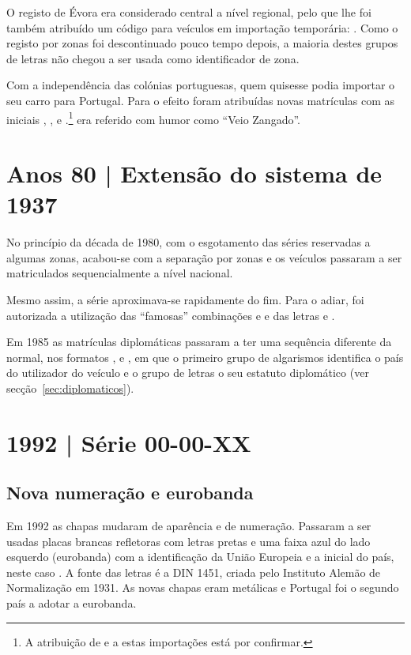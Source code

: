 O registo de Évora era considerado central a nível regional, pelo que lhe foi
também atribuído um código para veículos em importação temporária: .
Como o registo por zonas foi descontinuado pouco tempo depois, a maioria destes
grupos de letras não chegou a ser usada como identificador de zona.

Com a independência das colónias portuguesas, quem quisesse podia importar o seu
carro para Portugal. Para o efeito foram atribuídas novas matrículas com as
iniciais , ,  e .\footnote{A atribuição de  e  a estas importações está por confirmar.}
 era referido com humor como “Veio Zangado”.

\section{Anos 80 | Extensão do sistema de 1937}

No princípio da década de 1980, com o esgotamento das séries reservadas a algumas
zonas, acabou-se com a separação por zonas e os veículos passaram a ser
matriculados sequencialmente a nível nacional.

Mesmo assim, a série  aproximava-se rapidamente do fim. Para o
adiar, foi autorizada a utilização das “famosas” combinações  e
 e das letras  e .

Em 1985 as matrículas diplomáticas passaram a ter uma sequência diferente da
normal, nos formatos ,  e , em
que o primeiro grupo de algarismos identifica o país do utilizador do veículo e
o grupo de letras o seu estatuto diplomático (ver
secção~\ref{sec:diplomaticos}).


\section{1992 | Série 00-00-XX}
\subsection*{Nova numeração e eurobanda}

Em 1992 as chapas mudaram de aparência e de numeração. Passaram a ser usadas
placas brancas refletoras com letras pretas e uma faixa azul do lado esquerdo
(eurobanda) com a identificação da União Europeia e a inicial do país, neste caso
. A fonte das letras é a DIN 1451, criada pelo Instituto Alemão de
Normalização em 1931. As novas chapas eram metálicas e Portugal foi o segundo
país a adotar a eurobanda.

